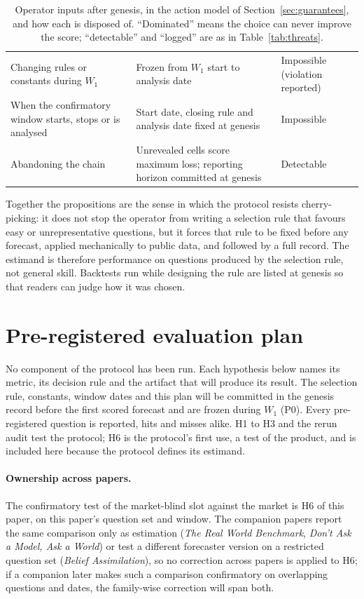 \documentclass[11pt]{article}
\begin{document}
\begin{table}[t]
\begin{tabularx}{\textwidth}{@{}>{\raggedright\arraybackslash}p{4.3cm}>{\raggedright\arraybackslash}X>{\raggedright\arraybackslash}p{2.5cm}@{}}
Changing rules or constants during $W_1$ & Frozen from $W_1$ start to analysis date & Impossible (violation reported) \\
When the confirmatory window starts, stops or is analysed & Start date, closing rule and analysis date fixed at genesis & Impossible \\
Abandoning the chain & Unrevealed cells score maximum loss; reporting horizon committed at genesis & Detectable \\
\bottomrule
\end{tabularx}
\caption{Operator inputs after genesis, in the action model of Section~\ref{sec:guarantees}, and how each is disposed of. ``Dominated'' means the choice can never improve the score; ``detectable'' and ``logged'' are as in Table~\ref{tab:threats}.}
\label{tab:choices}
\end{table}

Together the propositions are the sense in which the protocol resists cherry-picking: it does not stop the operator from writing a selection rule that favours easy or unrepresentative questions, but it forces that rule to be fixed before any forecast, applied mechanically to public data, and followed by a full record. The estimand is therefore performance on questions produced by the selection rule, not general skill. Backtests run while designing the rule are listed at genesis so that readers can judge how it was chosen.

\section{Pre-registered evaluation plan}
\label{sec:plan}

No component of the protocol has been run. Each hypothesis below names its metric, its decision rule and the artifact that will produce its result. The selection rule, constants, window dates and this plan will be committed in the genesis record before the first scored forecast and are frozen during $W_1$ (P0). Every pre-registered question is reported, hits and misses alike. H1 to H3 and the rerun audit test the protocol; H6 is the protocol's first use, a test of the product, and is included here because the protocol defines its estimand.

\paragraph{Ownership across papers.} The confirmatory test of the market-blind slot against the market is H6 of this paper, on this paper's question set and window. The companion papers report the same comparison only as estimation (\emph{The Real World Benchmark}, \emph{Don't Ask a Model, Ask a World}) or test a different forecaster version on a restricted question set (\emph{Belief Assimilation}), so no correction across papers is applied to H6; if a companion later makes such a comparison confirmatory on overlapping questions and dates, the family-wise correction will span both.
\end{document}
